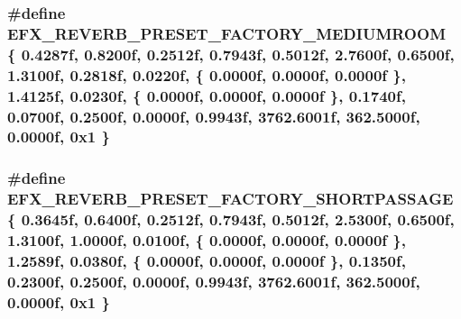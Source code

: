 \subsubsection[{\texorpdfstring{E\+F\+X\+\_\+\+R\+E\+V\+E\+R\+B\+\_\+\+P\+R\+E\+S\+E\+T\+\_\+\+F\+A\+C\+T\+O\+R\+Y\+\_\+\+M\+E\+D\+I\+U\+M\+R\+O\+OM}{EFX_REVERB_PRESET_FACTORY_MEDIUMROOM}}]{\setlength{\rightskip}{0pt plus 5cm}\#define E\+F\+X\+\_\+\+R\+E\+V\+E\+R\+B\+\_\+\+P\+R\+E\+S\+E\+T\+\_\+\+F\+A\+C\+T\+O\+R\+Y\+\_\+\+M\+E\+D\+I\+U\+M\+R\+O\+OM~\{ 0.\+4287f, 0.\+8200f, 0.\+2512f, 0.\+7943f, 0.\+5012f, 2.\+7600f, 0.\+6500f, 1.\+3100f, 0.\+2818f, 0.\+0220f, \{ 0.\+0000f, 0.\+0000f, 0.\+0000f \}, 1.\+4125f, 0.\+0230f, \{ 0.\+0000f, 0.\+0000f, 0.\+0000f \}, 0.\+1740f, 0.\+0700f, 0.\+2500f, 0.\+0000f, 0.\+9943f, 3762.\+6001f, 362.\+5000f, 0.\+0000f, 0x1 \}}\hypertarget{efx-presets_8h_afdd5df2559d5c60aa4a4729412405d06}{}\label{efx-presets_8h_afdd5df2559d5c60aa4a4729412405d06}
\subsubsection[{\texorpdfstring{E\+F\+X\+\_\+\+R\+E\+V\+E\+R\+B\+\_\+\+P\+R\+E\+S\+E\+T\+\_\+\+F\+A\+C\+T\+O\+R\+Y\+\_\+\+S\+H\+O\+R\+T\+P\+A\+S\+S\+A\+GE}{EFX_REVERB_PRESET_FACTORY_SHORTPASSAGE}}]{\setlength{\rightskip}{0pt plus 5cm}\#define E\+F\+X\+\_\+\+R\+E\+V\+E\+R\+B\+\_\+\+P\+R\+E\+S\+E\+T\+\_\+\+F\+A\+C\+T\+O\+R\+Y\+\_\+\+S\+H\+O\+R\+T\+P\+A\+S\+S\+A\+GE~\{ 0.\+3645f, 0.\+6400f, 0.\+2512f, 0.\+7943f, 0.\+5012f, 2.\+5300f, 0.\+6500f, 1.\+3100f, 1.\+0000f, 0.\+0100f, \{ 0.\+0000f, 0.\+0000f, 0.\+0000f \}, 1.\+2589f, 0.\+0380f, \{ 0.\+0000f, 0.\+0000f, 0.\+0000f \}, 0.\+1350f, 0.\+2300f, 0.\+2500f, 0.\+0000f, 0.\+9943f, 3762.\+6001f, 362.\+5000f, 0.\+0000f, 0x1 \}}\hypertarget{efx-presets_8h_affa348a7c6bf72fbc9eca06a9d1815ec}{}\label{efx-presets_8h_affa348a7c6bf72fbc9eca06a9d1815ec}
